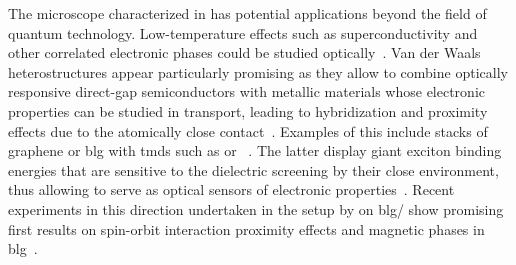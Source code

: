 The microscope characterized in \thispart has potential applications beyond the field of quantum technology.
Low-temperature effects such as superconductivity and other correlated electronic phases could be studied optically~\cite{Hadfield2016,Arora2020,Zhang2023}.
Van der Waals heterostructures appear particularly promising as they allow to combine optically responsive direct-gap semiconductors with metallic materials whose electronic properties can be studied in transport, leading to hybridization and proximity effects due to the atomically close contact~\cite{Geim2013}.
Examples of this include stacks of graphene or \gls{blg} with \glspl{tmd} such as  or ~\cite{Popert2022,Masseroni2024,Xie2024,Seiler2025}.
The latter display giant exciton binding energies that are sensitive to the dielectric screening by their close environment, thus allowing to serve as optical sensors of electronic properties~\cite{Popert2022,Tebbe2023}.
Recent experiments in this direction undertaken in the setup by \citet{Tebbe2025} on \acrshort{blg}/ show promising first results on spin-orbit interaction proximity effects and magnetic phases in \gls{blg}~\cite{Icking2024}.

